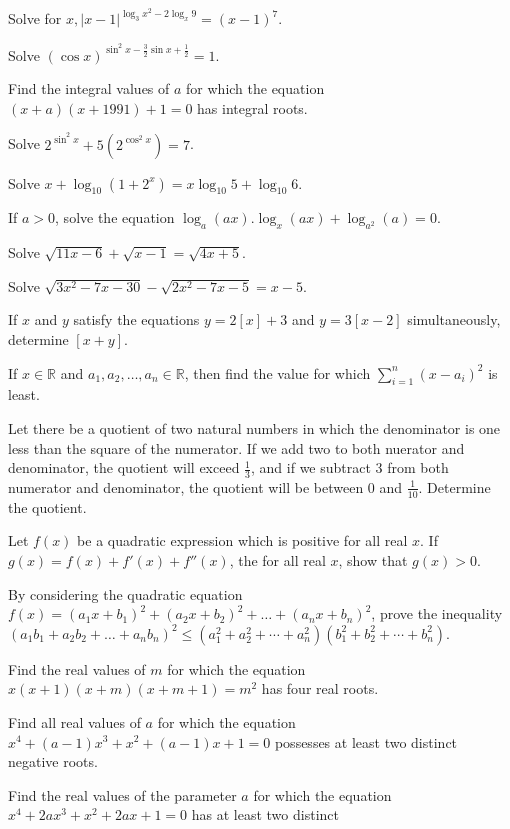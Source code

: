 \item Solve for $x, |x - 1|^{\log_3x^2 - 2\log_x9} = (x - 1)^7$.
\item Solve $(\cos x)^{\sin^2x - \tfrac{3}{2}\sin x + \tfrac{1}{2}} = 1$.
\item Find the integral values of $a$ for which the equation $(x + a)(x + 1991) + 1 = 0$ has integral roots.
\item Solve $2^{\sin^2x} + 5(2^{\cos^2x}) = 7$.
\item Solve $x + \log_{10}(1 + 2^x) = x\log_{10}5 + \log_{10}6$.
\item If $a > 0$, solve the equation $\log_a(ax).\log_x(ax) + \log_{a^2}(a) = 0$.
\item Solve $\sqrt{11x - 6} + \sqrt{x - 1} = \sqrt{4x + 5}$.
\item Solve $\sqrt{3x^2 - 7x - 30} - \sqrt{2x^2 - 7x - 5} = x - 5$.
\item If $x$ and $y$ satisfy the equations $y = 2[x] + 3$ and $y = 3[x - 2]$ simultaneously, determine $[x + y]$.
\item If $x\in\mathbb{R}$ and $a_1, a_2, \ldots, a_n\in\mathbb{R}$, then find the value for which $\displaystyle\sum_{i = 1}^n(x -
  a_i)^2$ is least.
\item Let there be a quotient of two natural numbers in which the denominator is one less than the square of the numerator. If we
  add two to both nuerator and denominator, the quotient will exceed $\frac{1}{3}$, and if we subtract $3$ from both numerator and
  denominator, the quotient will be between $0$ and $\frac{1}{10}$. Determine the quotient.
\item Let $f(x)$ be a quadratic expression which is positive for all real $x$. If $g(x) = f(x) + f'(x) + f''(x)$, the for all real
  $x$, show that $g(x) > 0$.
\item By considering the quadratic equation $f(x) = (a_1x + b_1)^2 + (a_2x + b_2)^2 + \ldots + (a_nx + b_n)^2$, prove the
  inequality $(a_1b_1 + a_2b_2 + \ldots + a_nb_n)^2\leq \left(a_1^2 + a_2^2 + \cdots + a_n^2\right)
  \left(b_1^2 + b_2^2 + \cdots + b_n^2\right)$.
\item Find the real values of $m$ for which the equation $x(x + 1)(x + m)(x + m + 1) = m^2$ has four real roots.
\item Find all real values of $a$ for which the equation $x^4 + (a - 1)x^3 + x^2 + (a - 1)x + 1 = 0$ possesses at least two
  distinct negative roots.
\item Find the real values of the parameter $a$ for which the equation $x^4 + 2ax^3 + x^2 + 2ax + 1 = 0$ has at least two distinct
